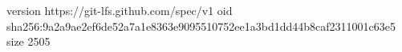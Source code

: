 version https://git-lfs.github.com/spec/v1
oid sha256:9a2a9ae2ef6de52a7a1e8363e9095510752ee1a3bd1dd44b8caf2311001c63e5
size 2505
